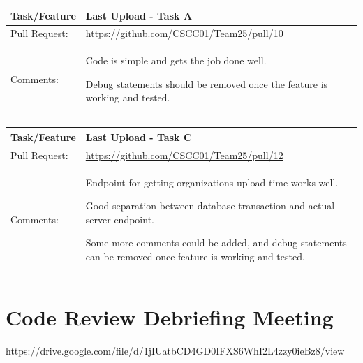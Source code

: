 \documentclass[12pt]{article}
\begin{document}
\begin{table}[H]
\begin{tabular}{|p{3cm}|p{11cm}|}
\hline
Task/Feature  & Last Upload - Task A
 \\ \hline
Pull Request: & \url{https://github.com/CSCC01/Team25/pull/10}                                                                                                                                                                                                                                                                                                                      \\ \hline

Comments:     & Code is simple and gets the job done well.

Debug statements should be removed once the feature is working and tested.

 \\ \hline
\end{tabular}
\end{table}

\begin{table}[H]
\begin{tabular}{|p{3cm}|p{11cm}|}
\hline
Task/Feature  & Last Upload - Task C
 \\ \hline
Pull Request: & \url{https://github.com/CSCC01/Team25/pull/12}                                                                                                                                                                                                                                                                                                                      \\ \hline

Comments:     & Endpoint for getting organizations upload time works well.

Good separation between database transaction and actual server endpoint.

Some more comments could be added, and debug statements can be removed once feature is working and tested.


 \\ \hline
\end{tabular}
\end{table}

\section{Code Review Debriefing Meeting}

https://drive.google.com/file/d/1jIUatbCD4GD0IFXS6WhI2L4zzy0ieBz8/view

\newpage


\end{document}

